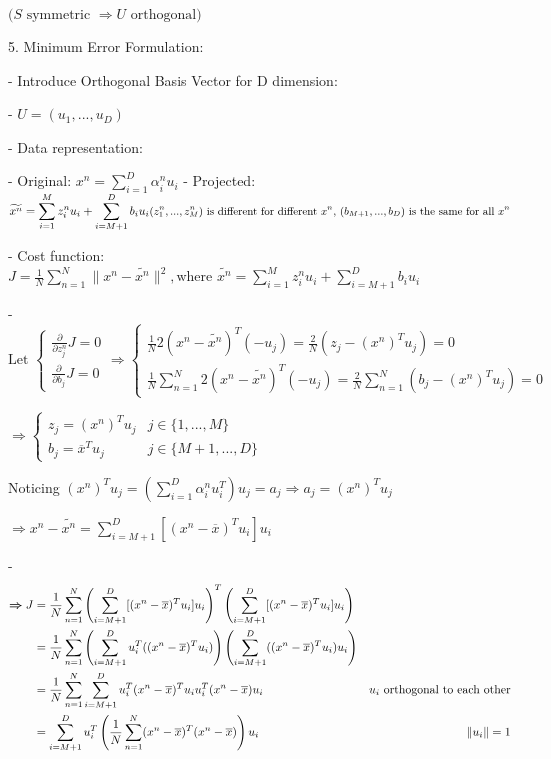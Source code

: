 	\(\text{($S$ symmetric $\Rightarrow U$ orthogonal)}\)

5. Minimum Error Formulation:

- Introduce Orthogonal Basis Vector for D dimension:

- $U=(u_1,...,u_D)$ 

- Data representation:

- Original: $\displaystyle x^n = \sum_{i=1}^D\alpha^n_iu_i$ 
- Projected: \(\displaystyle \widetilde {x^n} = \sum_{i=1}^Mz_i^nu_i+\sum_{i=M+1}^Db_iu_i \\ \small\text{$(z_1^n,...,z_M^n)$ is different for different $x^n$, $(b_{M+1},...,b_D)$ is the same for all  $x^n$}\)

- Cost function: $\displaystyle J=\frac1N \sum^N_{n=1}\|x^n-\widetilde{x^n}\|^2, \text{where } \widetilde{x^n}=\sum_{i=1}^Mz^n_iu_i + \sum_{i=M+1}^Db_iu_i$ 

- $\text{Let } \begin{cases} \displaystyle \frac \partial {\partial z^n_j} J=0 \\ \displaystyle \frac \partial {\partial b_j}J=0 \end{cases} \Rightarrow \begin{cases} \displaystyle \frac 1 N 2(x^n-\widetilde{x^n})^T (-u_j) = \frac 2 N (z_j-(x^n)^Tu_j)=0 \\ \displaystyle \frac 1 N \sum_{n=1}^N2 (x^n-\widetilde {x^n})^T(-u_j) = \frac 2 N \sum_{n=1}^N (b_j-(x^n)^Tu_j)=0 \end{cases}$ 

$\Rightarrow \begin{cases} z_j=(x^n)^Tu_j & j\in\{1,...,M\}\\ b_j=\overline{x}^Tu_j & j\in\{M+1,...,D\} \end{cases}$ 

Noticing $\displaystyle (x^n)^Tu_j=(\sum_{i=1}^D\alpha_i^nu_i^T)u_j = a_j \Rightarrow a_j = (x^n)^Tu_j$ 

$\displaystyle \Rightarrow x^n-\widetilde{x^n} = \sum_{i=M+1}^D[(x^n-\overline x)^Tu_i]u_i$ 

- \begin{align} \boldsymbol \Rightarrow \displaystyle J &= \frac 1 N \sum_{n=1}^N\space \left( \sum_{i=M+1}^D [(x^n-\overline x)^Tu_i]u_i\right)^T \left(\sum_{i=M+1}^D [(x^n-\overline x)^Tu_i]u_i\right) \\ &= \frac 1 N \sum_{n=1}^N \left( \sum_{i=M+1}^Du_i^T ((x^n-\overline x)^Tu_i)\right) \left( \sum_{i=M+1}^D ((x^n-\overline x)^Tu_i)u_i \right) \\ &= \frac 1 N \sum_{n=1}^N \sum_{i=M+1}^D u_i^T(x^n-\overline x)^Tu_iu_i^T(x^n-\overline x)u_i & u_i \text{ orthogonal to each other} \\ &= \sum_{i=M+1}^D u_i^T \left( \frac 1 N \sum_{n=1}^N(x^n-\overline x)^T(x^n-\overline x)\right) u_i & \|u_i\|=1 \\ \end{align} 

